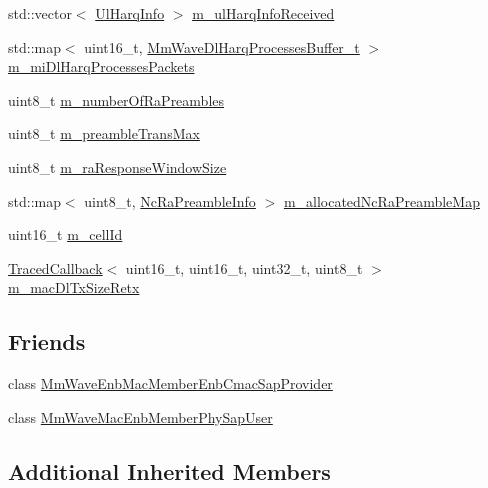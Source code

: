 \begin{DoxyCompactItemize}
\item 
std\+::vector$<$ \hyperlink{structns3_1_1UlHarqInfo}{Ul\+Harq\+Info} $>$ \hyperlink{classns3_1_1MmWaveEnbMac_a6beff4b0a92540e9be34e5d2fa2c7842}{m\+\_\+ul\+Harq\+Info\+Received}
\item 
std\+::map$<$ uint16\+\_\+t, \hyperlink{namespacens3_a7bb8c3b0b6663dc0e37e226a167498dd}{Mm\+Wave\+Dl\+Harq\+Processes\+Buffer\+\_\+t} $>$ \hyperlink{classns3_1_1MmWaveEnbMac_aa2508718e6021eb3e796e5aeab6dc219}{m\+\_\+mi\+Dl\+Harq\+Processes\+Packets}
\item 
uint8\+\_\+t \hyperlink{classns3_1_1MmWaveEnbMac_a502eb4952b5d1b4ec900b4a1a87c2b09}{m\+\_\+number\+Of\+Ra\+Preambles}
\item 
uint8\+\_\+t \hyperlink{classns3_1_1MmWaveEnbMac_aef250f882f47179d01462f761f88be20}{m\+\_\+preamble\+Trans\+Max}
\item 
uint8\+\_\+t \hyperlink{classns3_1_1MmWaveEnbMac_a8db7bd062ae554672abb903e9e729e75}{m\+\_\+ra\+Response\+Window\+Size}
\item 
std\+::map$<$ uint8\+\_\+t, \hyperlink{structns3_1_1MmWaveEnbMac_1_1NcRaPreambleInfo}{Nc\+Ra\+Preamble\+Info} $>$ \hyperlink{classns3_1_1MmWaveEnbMac_a3138c3896ca19151f6a08008669e07da}{m\+\_\+allocated\+Nc\+Ra\+Preamble\+Map}
\item 
uint16\+\_\+t \hyperlink{classns3_1_1MmWaveEnbMac_af44d2a225c1426897f84b74ed2a94afb}{m\+\_\+cell\+Id}
\item 
\hyperlink{classns3_1_1TracedCallback}{Traced\+Callback}$<$ uint16\+\_\+t, uint16\+\_\+t, uint32\+\_\+t, uint8\+\_\+t $>$ \hyperlink{classns3_1_1MmWaveEnbMac_a032e682229bff1f0d54f28c700a7f67d}{m\+\_\+mac\+Dl\+Tx\+Size\+Retx}
\end{DoxyCompactItemize}
\subsection*{Friends}
\begin{DoxyCompactItemize}
\item 
class \hyperlink{classns3_1_1MmWaveEnbMac_a1a1c8254dd4074e41aff36b4439fbdc2}{Mm\+Wave\+Enb\+Mac\+Member\+Enb\+Cmac\+Sap\+Provider}
\item 
class \hyperlink{classns3_1_1MmWaveEnbMac_ab0e8f39afa1fd3c520a5a9c56dd65722}{Mm\+Wave\+Mac\+Enb\+Member\+Phy\+Sap\+User}
\end{DoxyCompactItemize}
\subsection*{Additional Inherited Members}


